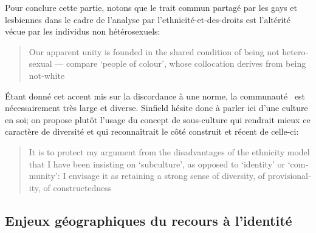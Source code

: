 Pour conclure cette partie, notons que le trait commun partagé par les gays et lesbiennes dans le cadre de l'analyse par l'ethnicité-et-des-droits est l'altérité vécue par les individus non hétérosexuels: \foreignblockquote{english}[{\cite[289]{Sinfield1996}}][.]{Our apparent unity is founded in the shared condition of being not heterosexual --- compare `people of colour', whose collocation derives from being not-white}.
Étant donné cet accent mis sur la discordance à une norme, la communauté \lgbt\ est nécessairement très large et diverse.
Sinfield hésite donc à parler ici d'une culture en soi; on propose plutôt l'usage du concept de sous-culture qui rendrait mieux ce caractère de diversité et qui reconnaîtrait le côté construit et récent de celle-ci:
\foreignblockquote{english}[{\cite[289]{Sinfield1996}}][.]{It is to protect my argument from the disadvantages of the ethnicity model that I have been insisting on `subculture', as opposed to `identity' or `community': I envisage it as retaining a strong sense of diversity, of provisionality, of constructedness}.



\subsection{Enjeux géographiques du recours à l'identité}
\label{sec:enjeux_g_ographiques_du_recours_l_identit_}


